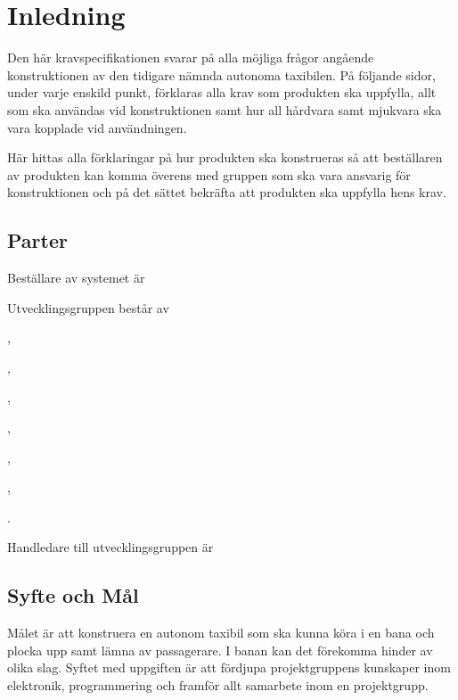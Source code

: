 \documentclass[kravspec/krav.tex]{subfiles}
\begin{document}
\section{Inledning}
Den här kravspecifikationen svarar på alla möjliga frågor angående
konstruktionen av den tidigare nämnda autonoma taxibilen. På följande sidor,
under varje enskild punkt, förklaras alla krav som produkten ska uppfylla,
allt som ska användas vid konstruktionen samt hur all hårdvara samt mjukvara
ska vara kopplade vid användningen.

Här hittas alla förklaringar på  hur produkten ska konstrueras så att
beställaren av produkten kan komma överens med gruppen som ska vara
ansvarig för konstruktionen och på det sättet bekräfta att produkten ska
uppfylla hens krav.

\subsection{Parter}
Beställare av systemet är
\begin{list}{}
    \item \bfseries \VARbestallare
\end{list}\vspace{4mm}

\noindent
Utvecklingsgruppen består av
{\bfseries\begin{list}{}
   \item \VARprojektledare,
   \item \VARdokumentansvarig,
   \item \VARgranssnitt,
   \item \VARhardware,
   \item \VARsekreterare,
   \item \VARkundansvarig,
   \item \VARarkitekt.
\end{list}}\vspace{4mm}

\noindent
Handledare till utvecklingsgruppen är
\begin{list}{}	
	\item \bfseries \VARhandledare
\end{list}\vspace{4mm}

\subsection{Syfte och Mål}
Målet är att konstruera en autonom taxibil som ska kunna köra i en bana och
plocka upp samt lämna av passagerare. I banan kan det förekomma hinder av olika
slag. Syftet med uppgiften är att fördjupa projektgruppens kunskaper inom
elektronik, programmering och framför allt samarbete inom en projektgrupp.
\end{document}

